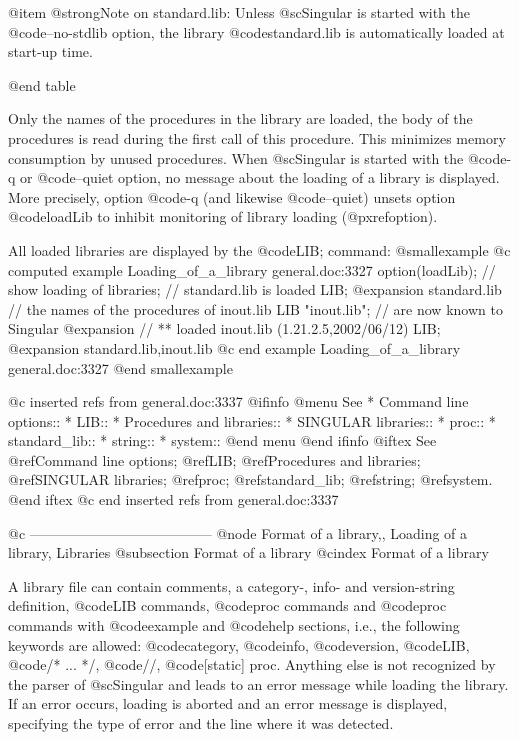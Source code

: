 {{{{@item @strong{Note on standard.lib:}
Unless  @sc{Singular} is started with the @code{--no-stdlib} option, the
library @code{standard.lib} is automatically loaded at start-up time.

@end table

Only the names of the procedures in the library are loaded, the body of
the procedures is read during the first call of this procedure. This minimizes
memory consumption by unused procedures.  When @sc{Singular} is started
with the @code{-q} or @code{--quiet} option, no message about the
loading of a library is displayed.  More precisely, option @code{-q} (and
likewise @code{--quiet}) unsets option @code{loadLib} to inhibit
monitoring of library loading (@pxref{option}).

All loaded libraries are displayed by the @code{LIB;}
command:
@smallexample
@c computed example Loading_of_a_library general.doc:3327 
  option(loadLib);   // show loading of libraries;
                     // standard.lib is loaded
  LIB;
@expansion{} standard.lib
                     // the names of the procedures of inout.lib
  LIB "inout.lib";   // are now known to Singular
@expansion{} // ** loaded inout.lib (1.21.2.5,2002/06/12)
  LIB;
@expansion{} standard.lib,inout.lib
@c end example Loading_of_a_library general.doc:3327
@end smallexample

@c inserted refs from general.doc:3337
@ifinfo
@menu
See
* Command line options::
* LIB::
* Procedures and libraries::
* SINGULAR libraries::
* proc::
* standard_lib::
* string::
* system::
@end menu
@end ifinfo
@iftex
See
@ref{Command line options};
@ref{LIB};
@ref{Procedures and libraries};
@ref{SINGULAR libraries};
@ref{proc};
@ref{standard_lib};
@ref{string};
@ref{system}.
@end iftex
@c end inserted refs from general.doc:3337

@c ---------------------------------------
@node Format of a library,, Loading of a library, Libraries
@subsection Format of a library
@cindex Format of a library

A library file can contain comments, a category-, info- and version-string
definition, @code{LIB} commands, @code{proc} commands
and @code{proc} commands with @code{example} and @code{help} sections,
i.e., the following keywords are allowed:
@code{category},
@code{info},
@code{version},
@code{LIB},
@code{/* ... */},
@code{//},
@code{[static] proc}.
Anything else is not recognized by the parser of @sc{Singular} and leads
to an error message while loading the library.
If an error occurs, loading is aborted and an error message is displayed,
specifying the type of error and the line where it was detected.

}}}}
